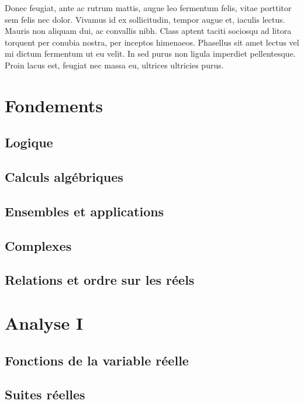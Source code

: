 \documentclass[a4paper,french,bookmarks]{book}
\begin{document}
    Donec feugiat, ante ac rutrum mattis, augue leo fermentum felis, vitae porttitor sem felis nec dolor. Vivamus id ex sollicitudin, tempor augue et, iaculis lectus. Mauris non aliquam dui, ac convallis nibh. Class aptent taciti sociosqu ad litora torquent per conubia nostra, per inceptos himenaeos. Phasellus sit amet lectus vel mi dictum fermentum ut eu velit. In sed purus non ligula imperdiet pellentesque. Proin lacus est, feugiat nec massa eu, ultrices ultricies purus.

    \tableofcontents
    
    \part{Fondements}
    
    \chapter{Logique}
    
    \chapter{Calculs algébriques}
    
    \chapter{Ensembles et applications}
    
    \chapter{Complexes}
    
    \chapter{Relations et ordre sur les réels}
    
    \part{Analyse I}
    
    \chapter{Fonctions de la variable réelle}
    
    \chapter{Suites réelles}
    
\end{document}
